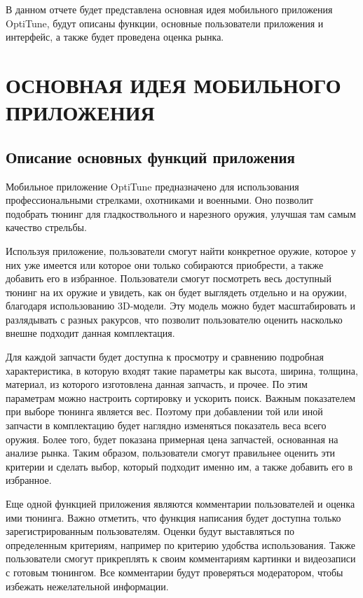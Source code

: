 \documentclass[14pt]{extreport}
\begin{document}
\pagestyle{empty} 


\pagestyle{plain}
\tableofcontents
 



\intro 

В данном отчете будет представлена основная идея мобильного приложения OptiTune, будут описаны функции, основные пользователи приложения и интерфейс, а также будет проведена оценка рынка.


\chapter{ОСНОВНАЯ ИДЕЯ МОБИЛЬНОГО ПРИЛОЖЕНИЯ\label{chapter1}}
\section{Описание основных функций приложения}

Мобильное приложение OptiTune предназначено для использования профессиональными стрелками, охотниками и военными. Оно позволит подобрать тюнинг для гладкоствольного и нарезного оружия, улучшая там самым качество стрельбы.

Используя приложение, пользователи смогут найти конкретное оружие, которое у них уже имеется или которое они только собираются приобрести, а также добавить его в избранное. Пользователи смогут посмотреть весь доступный тюнинг на их оружие и увидеть, как он будет выглядеть отдельно и на оружии, благодаря использованию 3D-модели. Эту модель можно будет масштабировать и разлядывать с разных ракурсов, что позволит пользователю оценить насколько внешне подходит данная комплектация.

Для каждой запчасти будет доступна к просмотру и сравнению подробная характеристика, в которую входят такие параметры как высота, ширина, толщина, материал, из которого изготовлена данная запчасть, и прочее. По этим параметрам можно настроить сортировку и ускорить поиск. Важным показателем при выборе тюнинга является вес. Поэтому при добавлении той или иной запчасти в комплектацию будет наглядно изменяться показатель веса всего оружия. Более того, будет показана примерная цена запчастей, основанная на анализе рынка. Таким образом, пользователи смогут правильнее оценить эти критерии и сделать выбор, который подходит именно им, а также добавить его в избранное.

Еще одной функцией приложения являются комментарии пользователей и оценка ими тюнинга. Важно отметить, что функция написания будет доступна только зарегистрированным пользователям. Оценки будут выставляться по определенным критериям, например по критерию удобства использования. Также пользователи смогут прикреплять к своим комментариям картинки и видеозаписи с готовым тюнингом. Все комментарии будут проверяться модератором, чтобы избежать нежелательной информации.
\end{document}
